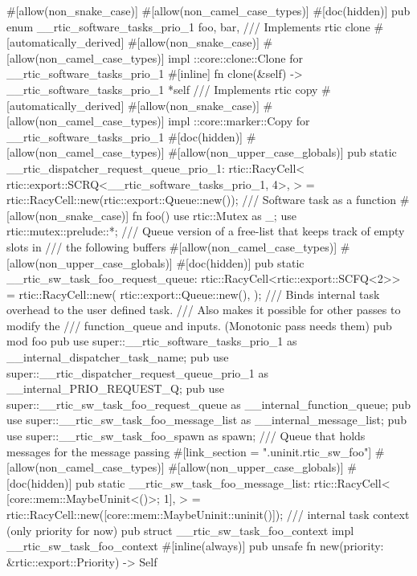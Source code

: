 {    #[allow(non_snake_case)]
    #[allow(non_camel_case_types)]
    #[doc(hidden)]
    pub enum __rtic_software_tasks_prio_1 {
        foo,
        bar,
    }
    /// Implements rtic clone
    #[automatically_derived]
    #[allow(non_snake_case)]
    #[allow(non_camel_case_types)]
    impl ::core::clone::Clone for __rtic_software_tasks_prio_1 {
        #[inline]
        fn clone(&self) -> __rtic_software_tasks_prio_1 {
            *self
        }
    }
    /// Implements rtic copy
    #[automatically_derived]
    #[allow(non_snake_case)]
    #[allow(non_camel_case_types)]
    impl ::core::marker::Copy for __rtic_software_tasks_prio_1 {}
    #[doc(hidden)]
    #[allow(non_camel_case_types)]
    #[allow(non_upper_case_globals)]
    pub static __rtic_dispatcher_request_queue_prio_1: rtic::RacyCell<
        rtic::export::SCRQ<__rtic_software_tasks_prio_1, 4>,
    > = rtic::RacyCell::new(rtic::export::Queue::new());
    /// Software task as a function
    #[allow(non_snake_case)]
    fn foo() {
        use rtic::Mutex as _;
        use rtic::mutex::prelude::*;
    }
    /// Queue version of a free-list that keeps track of empty slots in
    /// the following buffers
    #[allow(non_camel_case_types)]
    #[allow(non_upper_case_globals)]
    #[doc(hidden)]
    pub static __rtic_sw_task_foo_request_queue: rtic::RacyCell<rtic::export::SCFQ<2>> = rtic::RacyCell::new(
        rtic::export::Queue::new(),
    );
    /// Binds internal task overhead to the user defined task.
    /// Also makes it possible for other passes to modify the
    /// function_queue and inputs. (Monotonic pass needs them)
    pub mod foo {
        pub use super::__rtic_software_tasks_prio_1 as __internal_dispatcher_task_name;
        pub use super::__rtic_dispatcher_request_queue_prio_1 as __internal_PRIO_REQUEST_Q;
        pub use super::__rtic_sw_task_foo_request_queue as __internal_function_queue;
        pub use super::__rtic_sw_task_foo_message_list as __internal_message_list;
        pub use super::__rtic_sw_task_foo_spawn as spawn;
    }
    /// Queue that holds messages for the message passing
    #[link_section = ".uninit.rtic_sw_foo"]
    #[allow(non_camel_case_types)]
    #[allow(non_upper_case_globals)]
    #[doc(hidden)]
    pub static __rtic_sw_task_foo_message_list: rtic::RacyCell<
        [core::mem::MaybeUninit<()>; 1],
    > = rtic::RacyCell::new([core::mem::MaybeUninit::uninit()]);
    /// internal task context (only priority for now)
    pub struct __rtic_sw_task_foo_context {}
    impl __rtic_sw_task_foo_context {
        #[inline(always)]
        pub unsafe fn new(priority: &rtic::export::Priority) -> Self {
}}}
